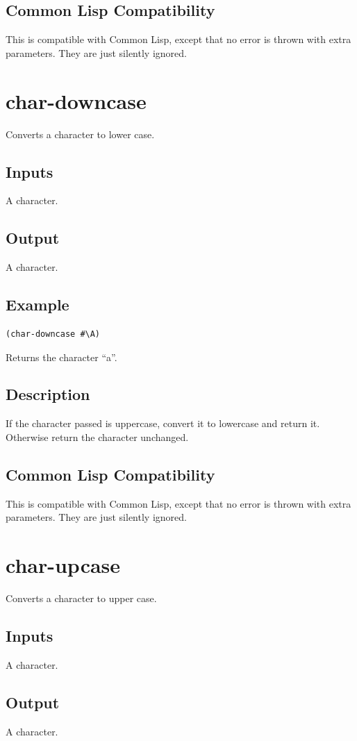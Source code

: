 \documentclass[10pt, openany]{book}
\newcommand{\cl}{Common Lisp}
\begin{document}
\subsection{Common Lisp Compatibility}
This is compatible with \cl, except that no error is thrown with extra parameters.  They are just silently ignored.

\section{char-downcase}
Converts a character to lower case.
\subsection{Inputs}
A character.
\subsection{Output}
A character.
\subsection{Example}
\begin{lstlisting}
(char-downcase #\A)
\end{lstlisting}
Returns the character ``a''.
\subsection{Description}
If the character passed is uppercase, convert it to lowercase and return it.  Otherwise return the character unchanged.
\subsection{Common Lisp Compatibility}
This is compatible with \cl, except that no error is thrown with extra parameters.  They are just silently ignored.

\section{char-upcase}
Converts a character to upper case.
\subsection{Inputs}
A character.
\subsection{Output}
A character.
\end{document}
